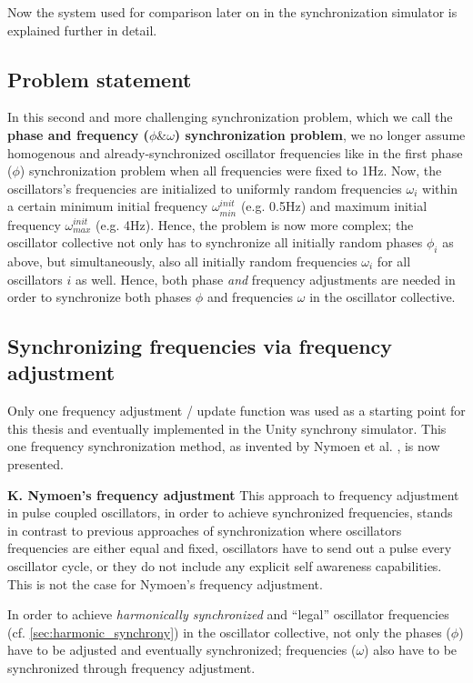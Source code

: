 	Now the system used for comparison later on in the synchronization simulator is explained further in detail.
	

	\subsection{Problem statement}

	In this second and more challenging synchronization problem, which we call the \textbf{phase and frequency ($\phi \& \omega$) synchronization problem}, we no longer assume homogenous and already-synchronized oscillator frequencies like in the first phase ($\phi$) synchronization problem when all frequencies were fixed to 1Hz. Now, the oscillators's frequencies are initialized to uniformly random frequencies $\omega_i$ within a certain minimum initial frequency $\omega_{min}^{init}$ (e.g. 0.5Hz) and maximum initial frequency $\omega_{max}^{init}$ (e.g. 4Hz).
	Hence, the problem is now more complex; the oscillator collective not only has to synchronize all initially random phases $\phi_i$ as above, but simultaneously, also all initially random frequencies $\omega_i$ for all oscillators $i$ as well. Hence, both phase \textit{and} frequency adjustments are needed in order to synchronize both phases $\phi$ and frequencies $\omega$ in the oscillator collective.


	\subsection{Synchronizing frequencies via frequency adjustment}
	\label{subsec:nymoen_freq_adj}

	Only one frequency adjustment / update function was used as a starting point for this thesis and eventually implemented in the Unity synchrony simulator. This one frequency synchronization method, as invented by Nymoen et al. \cite{nymoen_synch}, is now presented. \nl

	\textbf{K. Nymoen's frequency adjustment} \nl
	This approach to frequency adjustment in pulse coupled oscillators, in order to achieve synchronized frequencies, stands in contrast to previous approaches of synchronization where oscillators frequencies are either equal and fixed, oscillators have to send out a pulse every oscillator cycle, or they do not include any explicit self awareness capabilities. This is not the case for Nymoen's frequency adjustment.

	In order to achieve \textit{harmonically synchronized} and ``legal'' oscillator frequencies (cf. \ref{sec:harmonic_synchrony}) in the oscillator collective, not only the phases ($\phi$) have to be adjusted and eventually synchronized; frequencies ($\omega$) also have to be synchronized through frequency adjustment.
	

